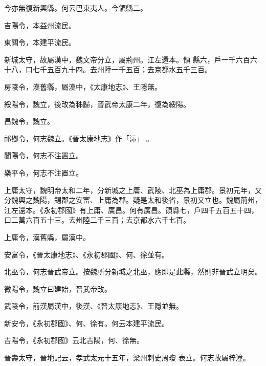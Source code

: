 \begin{pinyinscope}
 今亦無復新興縣。何云巴東夷人。今領縣二。



 吉陽令，本益州流民。



 東關令，本建平流民。



 新城太守，故屬漢中，魏文帝分立，屬荊州。江左還本。領
 縣六，戶一千六百六十八，口七千五百九十四。去州陸一千五百；去京都水五千三百。



 房陵令，漢舊縣，屬漢中，《太康地志》、王隱無。



 綏陽令，魏立，後改為秭歸，晉武帝太康二年，復為綏陽。



 昌魏令，魏立。


祁鄉令，何志魏立。《晉太康地志》作「沶」
 。



 閬陽令，何志不注置立。



 樂平令，何志不注置立。



 上庸太守，魏明帝太和二年，分新城之上庸、武陵、北巫為上庸郡。景初元年，又分魏興之魏陽，錫郡之安富、上庸為郡。疑是太和後省，景初又立也。魏屬荊州，江左還本。《永初郡國》有上庸、廣昌。何有廣昌。領縣七，戶四千五百五十四，口二萬六百五十三。去州陸二千三百；去京都水六千七百。



 上庸令，漢舊縣，屬漢中。



 安富令，《晉太康地志》、《永初郡國》、何、徐並有。



 北巫令，何志晉武帝立。按魏所分新城之北巫，應即是此縣，然則非晉武立明矣。



 微陽令，魏立曰建始，晉武帝改。



 武陵令，前漢屬漢中，後漢、《晉太康地志》、王隱並無。



 新安令，《永初郡國》、何、徐有。何云本建平流民。



 吉陽令，《永初郡國》云北吉陽，何、徐無。



 晉壽太守，晉地記云，孝武太元十五年，梁州刺史周瓊
 表立。何志故屬梓潼。




\end{pinyinscope}
